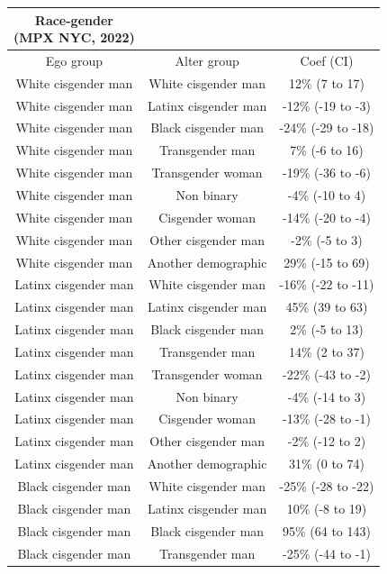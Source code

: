 \documentclass[
  letterpaper,
  DIV=11,
  numbers=noendperiod,
  oneside]{scrreprt}
\begin{document}
\begin{longtable*}{ccc}
\caption*{
{\large Race-gender} \\ 
{\small (MPX NYC, 2022)}
} \\ 
\toprule
Ego group & Alter group & Coef (CI) \\ 
\midrule\addlinespace[2.5pt]
White cisgender man & White cisgender man & 12\% (7 to 17)  \\ 
White cisgender man & Latinx cisgender man & -12\% (-19 to -3)  \\ 
White cisgender man & Black cisgender man & -24\% (-29 to -18)  \\ 
White cisgender man & Transgender man & 7\% (-6 to 16)  \\ 
White cisgender man & Transgender woman & -19\% (-36 to -6)  \\ 
White cisgender man & Non binary & -4\% (-10 to 4)  \\ 
White cisgender man & Cisgender woman & -14\% (-20 to -4)  \\ 
White cisgender man & Other cisgender man & -2\% (-5 to 3)  \\ 
White cisgender man & Another demographic & 29\% (-15 to 69)  \\ 
Latinx cisgender man & White cisgender man & -16\% (-22 to -11)  \\ 
Latinx cisgender man & Latinx cisgender man & 45\% (39 to 63)  \\ 
Latinx cisgender man & Black cisgender man & 2\% (-5 to 13)  \\ 
Latinx cisgender man & Transgender man & 14\% (2 to 37)  \\ 
Latinx cisgender man & Transgender woman & -22\% (-43 to -2)  \\ 
Latinx cisgender man & Non binary & -4\% (-14 to 3)  \\ 
Latinx cisgender man & Cisgender woman & -13\% (-28 to -1)  \\ 
Latinx cisgender man & Other cisgender man & -2\% (-12 to 2)  \\ 
Latinx cisgender man & Another demographic & 31\% (0 to 74)  \\ 
Black cisgender man & White cisgender man & -25\% (-28 to -22)  \\ 
Black cisgender man & Latinx cisgender man & 10\% (-8 to 19)  \\ 
Black cisgender man & Black cisgender man & 95\% (64 to 143)  \\ 
Black cisgender man & Transgender man & -25\% (-44 to -1)  \\ 

\end{longtable*}
\end{document}
